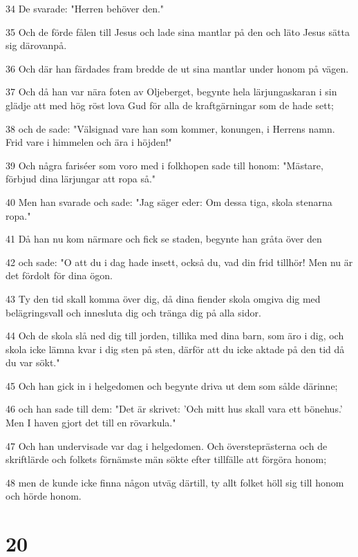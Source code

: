 \par 34 De svarade: "Herren behöver den."
\par 35 Och de förde fålen till Jesus och lade sina mantlar på den och läto Jesus sätta sig därovanpå.
\par 36 Och där han färdades fram bredde de ut sina mantlar under honom på vägen.
\par 37 Och då han var nära foten av Oljeberget, begynte hela lärjungaskaran i sin glädje att med hög röst lova Gud för alla de kraftgärningar som de hade sett;
\par 38 och de sade: "Välsignad vare han som kommer, konungen, i Herrens namn. Frid vare i himmelen och ära i höjden!"
\par 39 Och några fariséer som voro med i folkhopen sade till honom: "Mästare, förbjud dina lärjungar att ropa så."
\par 40 Men han svarade och sade: "Jag säger eder: Om dessa tiga, skola stenarna ropa."
\par 41 Då han nu kom närmare och fick se staden, begynte han gråta över den
\par 42 och sade: "O att du i dag hade insett, också du, vad din frid tillhör! Men nu är det fördolt för dina ögon.
\par 43 Ty den tid skall komma över dig, då dina fiender skola omgiva dig med belägringsvall och innesluta dig och tränga dig på alla sidor.
\par 44 Och de skola slå ned dig till jorden, tillika med dina barn, som äro i dig, och skola icke lämna kvar i dig sten på sten, därför att du icke aktade på den tid då du var sökt."
\par 45 Och han gick in i helgedomen och begynte driva ut dem som sålde därinne;
\par 46 och han sade till dem: "Det är skrivet: 'Och mitt hus skall vara ett bönehus.' Men I haven gjort det till en rövarkula."
\par 47 Och han undervisade var dag i helgedomen. Och översteprästerna och de skriftlärde och folkets förnämste män sökte efter tillfälle att förgöra honom;
\par 48 men de kunde icke finna någon utväg därtill, ty allt folket höll sig till honom och hörde honom.

\chapter{20}

